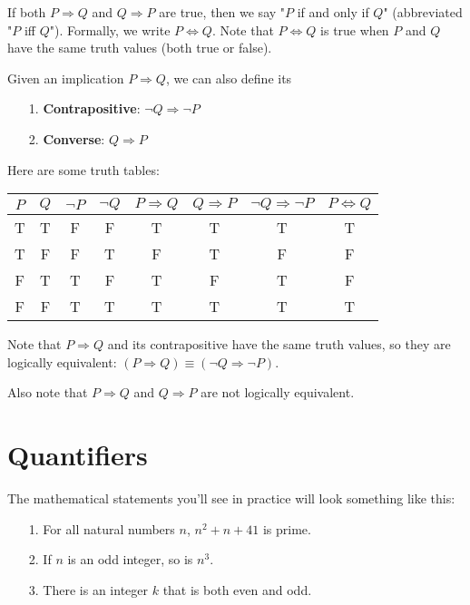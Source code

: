 \documentclass[12pt,a4paper]{article}
\begin{document}
If both $P\Rightarrow Q$ and $Q\Rightarrow P$ are true, then we say "$P$ if and only if $Q$" (abbreviated "$P$ iff $Q$"). Formally, we write $P\Leftrightarrow Q$. Note that $P\Leftrightarrow Q$ is true when $P$ and $Q$ have the same truth values (both true or false).

\bigbreak

Given an implication $P\Rightarrow Q$, we can also define its
\begin{itemize}
	\item[1.] \textbf{Contrapositive}: $\neg Q\Rightarrow \neg P$
	\item[2.] \textbf{Converse}: $Q\Rightarrow P$
\end{itemize}

\newpage

Here are some truth tables:

\begin{center}
	\begin{tabular}{ |c|c|c|c||c|c|c|c| }
		\hline
		$P$ & $Q$ & $\neg P$ & $\neg Q$ & $P\Rightarrow Q$ & $Q\Rightarrow P$ & $\neg Q\Rightarrow \neg P$ & $P\Leftrightarrow Q$ \\
		\hline
		T & T & F & F & T & T & T & T \\
		\hline
		T & F & F & T & F & T & F & F \\
		\hline
		F & T & T & F & T & F & T & F \\
		\hline
		F & F & T & T & T & T & T & T \\
		\hline
	\end{tabular}
\end{center}

Note that $P\Rightarrow Q$ and its contrapositive have the same truth values, so they are logically equivalent: $(P\Rightarrow Q)\equiv(\neg Q\Rightarrow\neg P)$.

\bigbreak

Also note that $P\Rightarrow Q$ and $Q\Rightarrow P$ are not logically equivalent.

\section*{Quantifiers}

The mathematical statements you'll see in practice will look something like this:
\begin{itemize}
	\item[1.] For all natural numbers $n$, $n^2+n+41$ is prime.
	\item[2.] If $n$ is an odd integer, so is $n^3$.
	\item[3.] There is an integer $k$ that is both even and odd.
\end{itemize}
\end{document}
